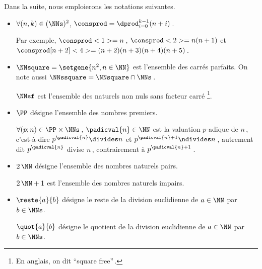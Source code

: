 Dans la suite, nous emploierons les notations suivantes.
%
\begin{itemize}
	\item $\forall (n, k) \in ( \NNs )^2$, $\consprod = \dprod_{i = 0}^{k-1} (n + i)$\,. 
	
	\noindent
	Par exemple,
	$\consprod<1> = n$\,,
	$\consprod<2> = n (n+1)$
	et
	$\consprod[n+2]<4> = (n+2) (n+3) (n+4) (n+5)$\,.


	\medskip
	\item $\NNsquare = \setgene{n^2, n \in \NN}$ est l'ensemble des carrés parfaits.
	On note aussi $\NNssquare = \NNsquare \cap \NNs$\,.

	\noindent
	$\NNsf$ est l'ensemble des naturels non nuls sans facteur carré
	\footnote{
		En anglais, on dit \enquote{square free}\,.
	}.


	\medskip
	\item $\PP$ désigne l'ensemble des nombres premiers.
	
	\noindent
	$\forall (p ; n) \in \PP \times \NNs$\,, $\padicval{n} \in \NN$ est la valuation $p$-adique de $n$\,,
	c'est-à-dire 
	$p^{\padicval{n}} \divides n$ et $p^{\padicval{n} + 1} \ndivides n$\,,
	autrement dit
	$p^{\padicval{n}}$ divise $n$\,, contrairement à $p^{\padicval{n} + 1}$\,.



	
	\medskip
	\item $2\,\NN$ désigne l'ensemble des nombres naturels pairs.
	
	\noindent
	$2\,\NN + 1$ est l'ensemble des nombres naturels impairs.


	\medskip
	\item $\reste{a}{b}$ désigne le reste de la division euclidienne de $a \in \NN$ par $b \in \NNs$.
 
	\noindent
	$\quot{a}{b}$ désigne le quotient de la division euclidienne de $a \in \NN$ par $b \in \NNs$.
\end{itemize}